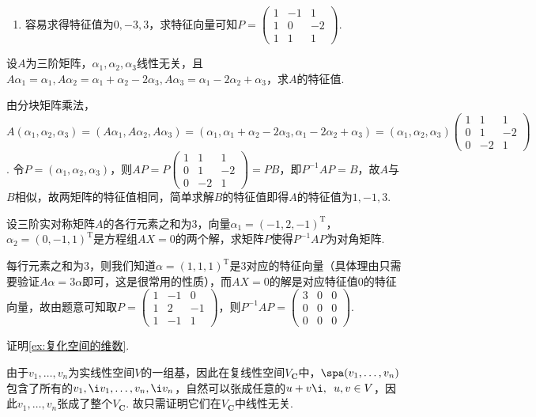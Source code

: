 \begin{exercise}
\begin{exgroup}
\begin{answer}
\begin{enumerate}
              \item 容易求得特征值为$0,-3,3$，求特征向量可知$P=\begin{pmatrix}
                            1 & -1 & 1 \\ 1 & 0 & -2 \\ 1 & 1 & 1
                        \end{pmatrix}$.
          \end{enumerate}
        \end{answer}
        \item 设$A$为三阶矩阵，$\alpha_1,\alpha_2,\alpha_3$线性无关，且$A\alpha_1=\alpha_1,A\alpha_2=\alpha_1+\alpha_2-2\alpha_3,A\alpha_3=\alpha_1-2\alpha_2+\alpha_3$，求$A$的特征值.
        \begin{answer}
            由分块矩阵乘法，$A(\alpha_1,\alpha_2,\alpha_3)=(A\alpha_1,A\alpha_2,A\alpha_3)=(\alpha_1,\alpha_1+\alpha_2-2\alpha_3,\alpha_1-2\alpha_2+\alpha_3)=(\alpha_1,\alpha_2,\alpha_3)\begin{pmatrix}
                1 & 1 & 1 \\ 0 & 1 & -2 \\ 0 & -2 & 1
            \end{pmatrix}$. 令$P=(\alpha_1,\alpha_2,\alpha_3)$，则$AP=P\begin{pmatrix}
                1 & 1 & 1 \\ 0 & 1 & -2 \\ 0 & -2 & 1
            \end{pmatrix}=PB$，即$P^{-1}AP=B$，故$A$与$B$相似，故两矩阵的特征值相同，简单求解$B$的特征值即得$A$的特征值为$1,-1,3$.
        \end{answer}
        \item 设三阶实对称矩阵$A$的各行元素之和为3，向量$\alpha_1=(-1,2,-1)^\mathrm{T}$，$\alpha_2=(0,-1,1)^\mathrm{T}$是方程组$AX=0$的两个解，求矩阵$P$使得$P^{-1}AP$为对角矩阵.
        \begin{answer}
            每行元素之和为3，则我们知道$\alpha=(1,1,1)^\mathrm{T}$是3对应的特征向量（具体理由只需要验证$A\alpha=3\alpha$即可，这是很常用的性质），而$AX=0$的解是对应特征值0的特征向量，故由题意可知取$P=\begin{pmatrix}
                1 & -1 & 0 \\ 1 & 2 & -1 \\ 1 & -1 & 1
            \end{pmatrix}$，则$P^{-1}AP=\begin{pmatrix}
                3 & 0 & 0 \\ 0 & 0 & 0 \\ 0 & 0 & 0
            \end{pmatrix}$.
        \end{answer}
        \item 证明\autoref{ex:复化空间的维数}.
        \begin{answer}
            由于$v_1,\ldots,v_n$为实线性空间$V$的一组基，因此在复线性空间$V_{\mathbf{C}}$中，$\spa(v_1,\ldots,v_n)$包含了所有的$v_1,\i v_1,\ldots,v_n,\i v_n$，自然可以张成任意的$u+v\i,\enspace u,v\in V$，因此$v_1,\ldots,v_n$张成了整个$V_{\mathbf{C}}$. 故只需证明它们在$V_\mathbf{C}$中线性无关.


\end{answer}
\end{exgroup}
\end{exercise}
